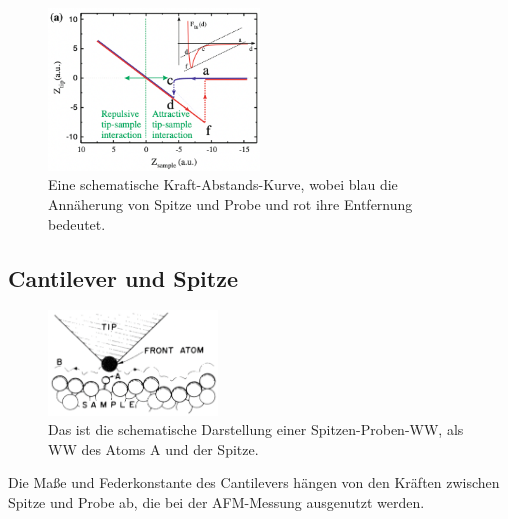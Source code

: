     \begin{figure}[ht]
        \centering\captionsetup{format=plain}
        \includegraphics[width=0.5\textwidth]{bilder/Kraft_Abstands_Kurve.png}
        \caption{Eine schematische Kraft-Abstands-Kurve, wobei blau die Annäherung von Spitze und Probe und rot ihre Entfernung bedeutet.}
        \label{fig:Kraft_Abstands_Kurve}
    \end{figure}
    \FloatBarrier

\subsection{Cantilever und Spitze}
\label{sec:cantilever}
    \setlength{\columnsep}{25pt}
    \begin{figure} \vspace*{-0.5cm}
        \centering{}
        \includegraphics[width=0.4\textwidth]{bilder/Federkraftkonstante.png}
        \caption{Das ist die schematische Darstellung einer Spitzen-Proben-WW, als WW des Atoms A und der Spitze.} \vspace*{-0.3cm}
        \label{fig:Federkraftkonstante}
    \end{figure} 
    \FloatBarrier
    Die Maße und Federkonstante des Cantilevers hängen von den Kräften zwischen Spitze und Probe ab, die bei der AFM-Messung ausgenutzt werden.
    
